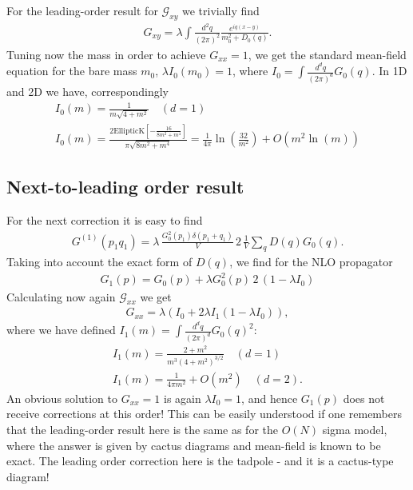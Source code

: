 \documentclass[12pt]{article}
\newcommand{\lr}[1]{ \left( #1 \right) }
\newcommand{\G}{\mathcal{G}}
\begin{document}
For the leading-order result for $\G_{x y}$ we trivially find
\begin{eqnarray}
\label{order0}
 G_{x y} = \lambda \int \frac{d^2 q}{\lr{2 \pi}^2} \frac{e^{i q \lr{x - y}}}{m_0^2 + D_0\lr{q}} .
\end{eqnarray}
Tuning now the mass in order to achieve $G_{xx} = 1$, we get the standard mean-field equation for the bare mass $m_0$, $\lambda I_0\lr{m_0} = 1$, where $I_0 = \int \frac{d^d q}{\lr{2 \pi}^d} G_0\lr{q}$. In 1D and 2D we have, correspondingly
\begin{eqnarray}
\label{lattice_I0_1D}
 I_0\lr{m} = \frac{1}{m \sqrt{4 + m^2}} \quad (d = 1)
 \nonumber \\
\label{lattice_I0_2D}
 I_0\lr{m} = \frac{2 \text{EllipticK}\left[-\frac{16}{8 m^2 + m^4}\right]}{\pi  \sqrt{8 m^2 + m^4}} =
 \frac{1}{4 \pi} \ln\lr{\frac{32}{m^2}} + O\lr{m^2 \ln\lr{m}}
\end{eqnarray}

\subsection*{Next-to-leading order result}

 For the next correction it is easy to find
\begin{eqnarray}
\label{nlo_Gpq}
 G^{\lr{1}}\lr{p_1 q_1} = \lambda \, \frac{G_0^2\lr{p_1} \delta\lr{p_1 + q_1}}{V}
 \, 2 \, \frac{1}{V} \sum\limits_q D\lr{q} G_0\lr{q} .
\end{eqnarray}
Taking into account the exact form of $D\lr{q}$, we find for the NLO propagator
\begin{eqnarray}
\label{nlo_Gpq}
 G_1\lr{p} = G_0\lr{p} + \lambda G_0^2\lr{p} \, 2 \, \lr{1 - \lambda I_0}
\end{eqnarray}
Calculating now again $\G_{xx}$ we get
\begin{eqnarray}
\label{nlo_Gxx}
 G_{xx} = \lambda \lr{I_0 + 2 \lambda I_1 \lr{1 - \lambda I_0}} ,
\end{eqnarray}
where we have defined $I_1\lr{m} = \int \frac{d^d q}{\lr{2 \pi}^d} G_0\lr{q}^2$:
\begin{eqnarray}
\label{lattice_I1_1D}
  I_1\lr{m} = \frac{2 + m^2}{m^3 \lr{4 + m^2}^{3/2}} \quad (d = 1)
 \nonumber \\
\label{lattice_I0_2D}
 I_1\lr{m} = \frac{1}{4 \pi m^2} + O\lr{m^2} \quad (d = 2) .
\end{eqnarray}
An obvious solution to $G_{xx} = 1$ is again $\lambda I_0 = 1$, and hence $G_1\lr{p}$ does not receive corrections at this order! This can be easily understood if one remembers that the leading-order result here is the same as for the $O\lr{N}$ sigma model, where the answer is given by cactus diagrams and mean-field is known to be exact. The leading order correction here is the tadpole - and it is a cactus-type diagram!
\end{document}
